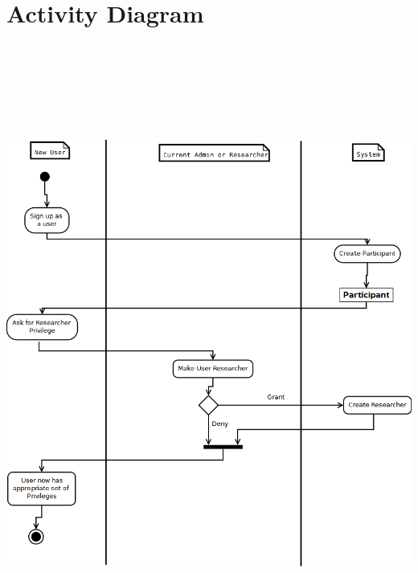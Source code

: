 \section{Activity Diagram}
\includegraphics[height=8in]{../other/Activity-Diagram/become_researcher_activity_diagram}